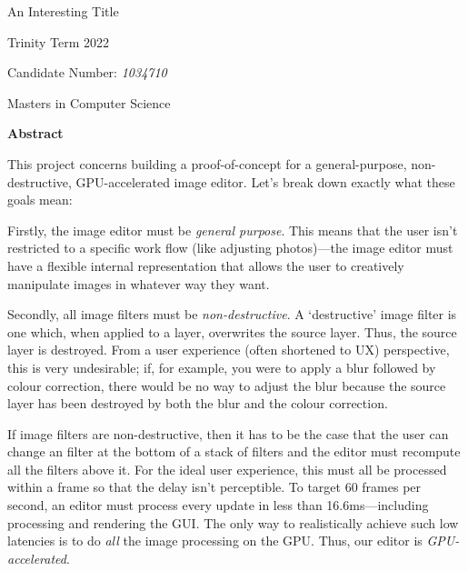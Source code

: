 \documentclass[12pt]{article}
\begin{document}

\begin{titlepage}
    \begin{center}
        \vspace*{2in}

        \Huge
        An Interesting Title

        \vspace*{2in}

        \Large

        Trinity Term 2022

        \vspace*{0.25in}
        Candidate Number: \emph{1034710}

        \vspace*{0.25in}
        Masters in Computer Science
    \end{center}
\end{titlepage}



\begin{center}
    \large \textbf{Abstract}
\end{center}

This project concerns building a proof-of-concept for a general-purpose, non-destructive,
GPU-accelerated image editor.  Let's break down exactly what these goals mean:

Firstly, the image editor must be \emph{general purpose}.  This means that the user isn't restricted
to a specific work flow (like adjusting photos)---the image editor must have a flexible internal
representation that allows the user to creatively manipulate images in whatever way they want.

Secondly, all image filters must be \emph{non-destructive}.  A `destructive' image filter is one
which, when applied to a layer, overwrites the source layer.  Thus, the source layer is destroyed.
From a user experience (often shortened to UX) perspective, this is very undesirable; if, for
example, you were to apply a blur followed by colour correction, there would be no way to adjust the
blur because the source layer has been destroyed by both the blur and the colour correction.

If image filters are non-destructive, then it has to be the case that the user can change an filter
at the bottom of a stack of filters and the editor must recompute all the filters above it.  For the
ideal user experience, this must all be processed within a frame so that the delay isn't
perceptible.  To target 60 frames per second, an editor must process every update in less than
16.6ms---including processing and rendering the GUI.  The only way to realistically achieve such
low latencies is to do \emph{all} the image processing on the GPU.  Thus, our editor is
\emph{GPU-accelerated}.
\end{document}
